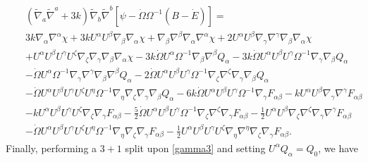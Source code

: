 \documentclass[10pt,letterpaper]{article}
\numberwithin{equation}{section}
\begin{document}
\begin{eqnarray}
&&(\tilde\nabla_a\tilde\nabla^a + 3k)\tilde\nabla_b\tilde\nabla^b[ \psi-\dot \Omega \Omega^{-1}(B-\dot E)]=
\nonumber\\
&&3 k \nabla_{\alpha }\nabla^{\alpha }\chi + 3 k U^{\alpha } U^{\beta } \nabla_{\beta }\nabla_{\alpha }\chi + \nabla_{\beta }\nabla^{\beta }\nabla_{\alpha }\nabla^{\alpha }\chi + 2 U^{\alpha } U^{\beta } \nabla_{\gamma }\nabla^{\gamma }\nabla_{\beta }\nabla_{\alpha }\chi \nonumber \\ 
&& + U^{\alpha } U^{\beta } U^{\gamma } U^{\zeta } \nabla_{\zeta }\nabla_{\gamma }\nabla_{\beta }\nabla_{\alpha }\chi -3 k \dot{\Omega} U^{\alpha } \Omega^{-1} \nabla_{\beta }\nabla^{\beta }Q_{\alpha } - 3 k \dot{\Omega} U^{\alpha } U^{\beta } U^{\gamma } \Omega^{-1} \nabla_{\gamma }\nabla_{\beta }Q_{\alpha } \nonumber \\ 
&& -  \dot{\Omega} U^{\alpha } \Omega^{-1} \nabla_{\gamma }\nabla^{\gamma }\nabla_{\beta }\nabla^{\beta }Q_{\alpha } - 2 \dot{\Omega} U^{\alpha } U^{\beta } U^{\gamma } \Omega^{-1} \nabla_{\zeta }\nabla^{\zeta }\nabla_{\gamma }\nabla_{\beta }Q_{\alpha } \nonumber \\ 
&& -  \dot{\Omega} U^{\alpha } U^{\beta } U^{\gamma } U^{\zeta } U^{\eta } \Omega^{-1} \nabla_{\eta }\nabla_{\zeta }\nabla_{\gamma }\nabla_{\beta }Q_{\alpha }-6 k \dot{\Omega} U^{\alpha } U^{\beta } U^{\gamma } \Omega^{-1} \nabla_{\gamma }F_{\alpha \beta } -  k U^{\alpha } U^{\beta } \nabla_{\gamma }\nabla^{\gamma }F_{\alpha \beta } \nonumber \\ 
&& -  k U^{\alpha } U^{\beta } U^{\gamma } U^{\zeta } \nabla_{\zeta }\nabla_{\gamma }F_{\alpha \beta } -  \tfrac{5}{2} \dot{\Omega} U^{\alpha } U^{\beta } U^{\gamma } \Omega^{-1} \nabla_{\zeta }\nabla^{\zeta }\nabla_{\gamma }F_{\alpha \beta } -  \tfrac{1}{2} U^{\alpha } U^{\beta } \nabla_{\zeta }\nabla^{\zeta }\nabla_{\gamma }\nabla^{\gamma }F_{\alpha \beta } \nonumber \\ 
&& -  \dot{\Omega} U^{\alpha } U^{\beta } U^{\gamma } U^{\zeta } U^{\eta } \Omega^{-1} \nabla_{\eta }\nabla_{\zeta }\nabla_{\gamma }F_{\alpha \beta } -  \tfrac{1}{2} U^{\alpha } U^{\beta } U^{\gamma } U^{\zeta } \nabla_{\eta }\nabla^{\eta }\nabla_{\zeta }\nabla_{\gamma }F_{\alpha \beta }.
\label{gamma3}
\end{eqnarray}
Finally, performing a $3+1$ split upon \eqref{gamma3} and setting $U^\alpha Q_\alpha = Q_0$, we have
\end{document}
